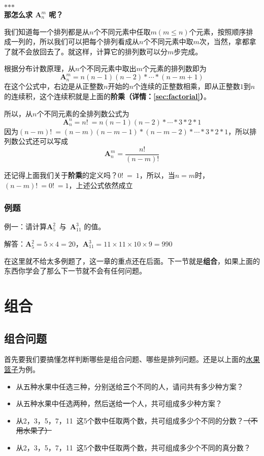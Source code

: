 \documentclass[a5paper]{article}
\begin{document}
\noindent\hfil$*$\hfil$*$\hfil$*$\hfil \\

\textbf{那怎么求 $\textbf{A}_{n}^{m}$ 呢？} 

我们知道每一个排列都是从$n$个不同元素中任取$m(m \le n)$个元素，按照顺序排成一列的，所以我们可以把每个排列看成从$n$个不同元素中取$m$次，当然，拿都拿了就不会放回去了。就这样，计算它的排列数可以分$m$步完成。

根据分布计数原理，从$n$个不同元素中取出$m$个元素的排列数即为
\begin{equation*}
    \textbf{A}_{n}^{m} = n(n-1)(n-2)*\cdots{}*(n-m+1)
\end{equation*}
在这个公式中，右边是从正整数$n$开始的$n$个连续的正整数相乘，即从正整数$1$到$n$的连续积，这个连续积就是上面的\textbf{阶乘（详情：\ref{sec:factorial}）}。

所以，从$n$个不同元素的全排列数公式为
\begin{equation*}
    \textbf{A}_{n}^{n}=n!~=n(n-1)(n-2)*\cdots{}*3*2*1
\end{equation*}
因为$(n-m)!~=(n-m)(n-m-1)*(n-m-2)*\cdots{}*3*2*1$，所以排列数公式还可以写成
\begin{equation}
    \textbf{A}_{n}^{m}=\frac{n!}{(n-m)!}
\end{equation}

还记得上面我们关于\textbf{阶乘}的定义吗？$0!~=~1$，所以，当$n=m$时，$(n-m)!~=0!~=1$，上述公式依然成立

\subsubsection{例题}
{\color{blue} 例一：}{请计算$\textbf{A}_{5}^{2}$}~与~$\textbf{A}_{11}^{3}$ 的值。

{\color{blue} 解答：}$\textbf{A}_{5}^{2} = 5 \times 4 = 20$，$\textbf{A}_{11}^{3}=11 \times 11 \times 10 \times 9 = 990$

在这里就不给太多例题了，这一章的重点还在后面。下一节就是\textbf{组合}，如果上面的东西你学会了那么下一节就不会有任何问题。

\section{\textbf{组合}}

\subsection{组合问题}

首先要我们要搞懂怎样判断哪些是组合问题、哪些是排列问题。还是以上面的\underline{水果篮子}为例。
\begin{itemize}
    \item 从五种水果中任选三种，分别送给\textbf{三}个不同的人，请问共有多少种方案？
    \item 从五种水果中任选两种，然后送给\textbf{一}个人，共可组成多少种方案？
    \item 从2，3，5，7，11~这5个数中任取两个数，共可组成多少个不同的分数？\sout{（不用水果了）}
    \item 从2，3，5，7，11~这5个数中任取两个数，共可组成多少个不同的真分数？
\end{itemize}
\end{document}
